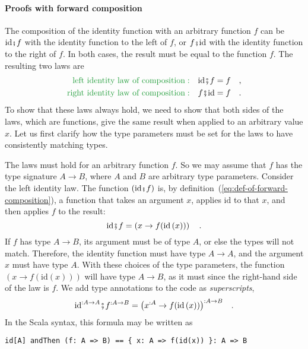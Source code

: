\paragraph{Proofs with forward composition}

The composition of the identity function with an arbitrary function
$f$ can be $\text{id}\bef f$ with the identity function to the left
of $f$, or $f\bef\text{id}$ with the identity function to the right
of $f$. In both cases, the result must be equal to the function $f$.
The resulting two laws are
\begin{align*}
{\color{greenunder}\text{left identity law of composition}:}\quad & \text{id}\bef f=f\quad,\\
{\color{greenunder}\text{right identity law of composition}:}\quad & f\bef\text{id}=f\quad.
\end{align*}
To show that these laws always hold, we need to show that both sides
of the laws, which are functions, give the same result when applied
to an arbitrary value $x$. Let us first clarify how the type parameters
must be set for the laws to have consistently matching types.

The laws must hold for an arbitrary function $f$. So we may assume
that $f$ has the type signature $A\rightarrow B$, where $A$ and
$B$ are arbitrary type parameters. Consider the left identity law.
The function $(\text{id}\bef f)$ is, by definition~(\ref{eq:def-of-forward-composition}),
a function that takes an argument $x$, applies $\text{id}$ to that
$x$, and then applies $f$ to the result: 
\[
\text{id}\bef f=\left(x\rightarrow f(\text{id}\,(x))\right)\quad.
\]
If $f$ has type $A\rightarrow B$, its argument must be of type $A$,
or else the types will not match. Therefore, the identity function
must have type $A\rightarrow A$, and the argument $x$ must have
type $A$. With these choices of the type parameters, the function
$\left(x\rightarrow f(\text{id}(x))\right)$ will have type $A\rightarrow B$,
as it must since the right-hand side of the law is $f$. We add type
annotations to the code as \emph{superscripts},
\[
\text{id}^{:A\rightarrow A}\bef f^{:A\rightarrow B}=\big(x^{:A}\rightarrow f(\text{id}\,(x))\big)^{:A\rightarrow B}\quad.
\]
In the Scala syntax, this formula may be written as
\begin{lstlisting}
id[A] andThen (f: A => B) == { x: A => f(id(x)) }: A => B
\end{lstlisting}
\begin{comment}
It is quicker to write code in the mathematical notation than in the
Scala syntax. 
\end{comment}

